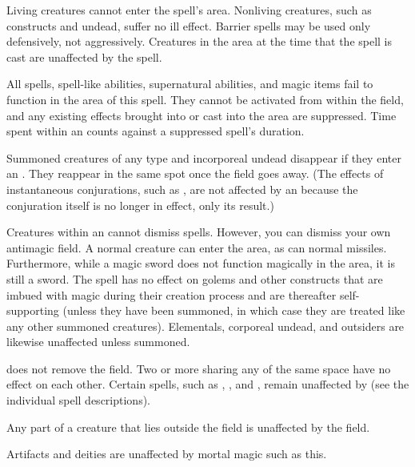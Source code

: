 \spelldur{\durlong \dismissable}
\spellline
\spelleffect Living creatures cannot enter the spell's area. Nonliving creatures, such as constructs and undead, suffer no ill effect.
\spellnotes Barrier spells may be used only defensively, not aggressively. Creatures in the area at the time that the spell is cast are unaffected by the spell.

\spelldur{\durlong \dismissable}
\spellline
\spelleffect All spells, spell-like abilities, supernatural abilities, and magic items fail to function in the area of this spell. They cannot be activated from within the field, and any existing effects brought into or cast into the area are suppressed. Time spent within an  counts against a suppressed spell's duration.
\par Summoned creatures of any type and incorporeal undead disappear if they enter an . They reappear in the same spot once the field goes away. (The effects of instantaneous conjurations, such as , are not affected by an  because the conjuration itself is no longer in effect, only its result.)
\par Creatures within an  cannot dismiss spells. However, you can dismiss your own antimagic field.
\spellnotes A normal creature can enter the area, as can normal missiles. Furthermore, while a magic sword does not function magically in the area, it is still a sword. The spell has no effect on golems and other constructs that are imbued with magic during their creation process and are thereafter self-supporting (unless they have been summoned, in which case they are treated like any other summoned creatures). Elementals, corporeal undead, and outsiders are likewise unaffected unless summoned.
\par {} does not remove the field. Two or more  sharing any of the same space have no effect on each other. Certain spells, such as , , and , remain unaffected by  (see the individual spell descriptions).
\par Any part of a creature that lies outside the field is unaffected by the field.
\par Artifacts and deities are unaffected by mortal magic such as this. 

